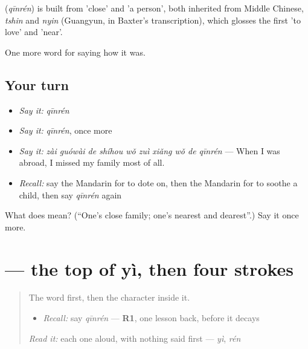 \begin{cousinweb}
\textbf{} (\emph{qīnrén}) is built from  'close' and  'a person', both inherited from Middle Chinese, \emph{tshin} and \emph{nyin} (Guangyun, in Baxter's transcription), which glosses the first 'to love' and 'near'.
\end{cousinweb}

\begin{grammarlens}[title={What you've built}]
One more word for saying how it was.
\end{grammarlens}

\subsection*{Your turn}
\begin{itemize}
\raggedright
  \item \emph{Say it:} \emph{qīnrén}
  \item \emph{Say it:} \emph{qīnrén}, once more
  \item \emph{Say it:} \emph{zài guówài de shíhou wǒ zuì xiǎng wǒ de qīnrén} — When I was abroad, I missed my family most of all.
  \item \emph{Recall:} say the Mandarin for to dote on, then the Mandarin for to soothe a child, then say \emph{qīnrén} again
\end{itemize}

\begin{tcolorbox}[breakable,colback=teal!4,colframe=teal!35!black,title={Before you move on}]
What does  mean? (\textquotedblleft{}One's close family; one's nearest and dearest\textquotedblright{}.) Say it once more.
\end{tcolorbox}
\section[\texorpdfstring{\zh{亲} (qīn)}{亲 (qīn)}]{ — the top of yì, then four strokes}

\label{lesson:ZH-W511-qin-kin}



\begin{quote}
The word first, then the character inside it.

\begin{itemize}
\raggedright
  \item \emph{Recall:} say \emph{qīnrén} — \textbf{R1}, one lesson back, before it decays
\end{itemize}

\begin{quote}
 
\end{quote}

\emph{Read it:} each one aloud, with nothing said first — \emph{yì}, \emph{rén}
\end{quote}

